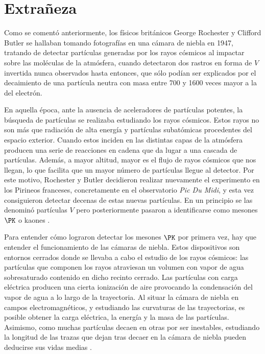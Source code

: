 \chapter{Extrañeza}\label{cap:strangeness}
Como se comentó anteriormente, los físicos británicos George Rochester y Clifford Butler se hallaban tomando fotografías en una cámara de niebla en 1947, tratando de detectar partículas generadas por los rayos cósmicos al impactar sobre las moléculas de la atmósfera, cuando detectaron dos rastros en forma de $V$ invertida nunca observados hasta entonces, que sólo podían ser explicados por el decaimiento de una partícula neutra con masa entre 700 y 1600 veces mayor a la del electrón. 

En aquella época, ante la ausencia de aceleradores de partículas potentes, la búsqueda de partículas se realizaba estudiando los rayos cósmicos. Estos rayos no son más que radiación de alta energía y partículas subatómicas procedentes del espacio exterior. Cuando estos inciden en las distintas capas de la atmósfera producen una serie de reacciones en cadena que da lugar a una cascada de partículas. Además, a mayor altitud, mayor es el flujo de rayos cósmicos que nos llegan, lo que facilita que un mayor número de partículas llegue al detector. Por este motivo, Rochester y Butler decidieron realizar nuevamente el experimento en los Pirineos franceses, concretamente en el observatorio \textit{Pic Du Midi}, y esta vez consiguieron detectar decenas de estas nuevas partículas. En un principio se las denominó partículas $V$ pero posteriormente pasaron a identificarse como mesones $\PK$ o kaones \cite{Griffiths2008}.

Para entender cómo lograron detectar los mesones $\PK$ por primera vez, hay que entender el funcionamiento de las cámaras de niebla. Estos dispositivos son entornos cerrados donde se llevaba a cabo el estudio de los rayos cósmicos: las partículas que componen los rayos atraviesan un volumen con vapor de agua sobresaturado contenido en dicho recinto cerrado. Las partículas con carga eléctrica producen una cierta ionización de aire provocando la condensación del vapor de agua a lo largo de la trayectoria.  Al situar la cámara de niebla en campos electromagnéticos, y estudiando las curvaturas de las trayectorias, es posible obtener la carga eléctrica, la energía y la masa de las partículas.  Asimismo, como muchas partículas decaen en otras por ser inestables, estudiando la longitud de las trazas que dejan tras decaer en la cámara de niebla pueden deducirse sus vidas medias \cite{notas2020}.

